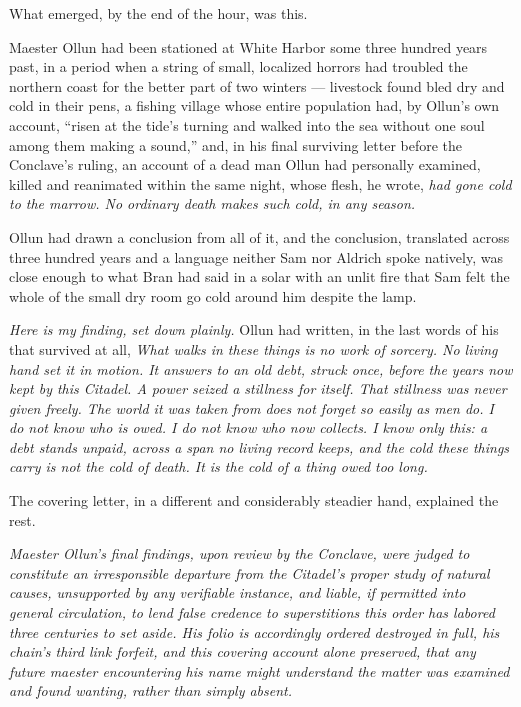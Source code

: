What emerged, by the end of the hour, was this.

Maester Ollun had been stationed at White Harbor some three hundred years past, in a period when a string of small, localized horrors had troubled the northern coast for the better part of two winters — livestock found bled dry and cold in their pens, a fishing village whose entire population had, by Ollun’s own account, “risen at the tide’s turning and walked into the sea without one soul among them making a sound,” and, in his final surviving letter before the Conclave’s ruling, an account of a dead man Ollun had personally examined, killed and reanimated within the same night, whose flesh, he wrote, \textit{had gone cold to the marrow. No ordinary death makes such cold, in any season.}

Ollun had drawn a conclusion from all of it, and the conclusion, translated across three hundred years and a language neither Sam nor Aldrich spoke natively, was close enough to what Bran had said in a solar with an unlit fire that Sam felt the whole of the small dry room go cold around him despite the lamp.

\textit{Here is my finding, set down plainly.} Ollun had written, in the last words of his that survived at all, \textit{What walks in these things is no work of sorcery. No living hand set it in motion. It answers to an old debt, struck once, before the years now kept by this Citadel. A power seized a stillness for itself. That stillness was never given freely. The world it was taken from does not forget so easily as men do. I do not know who is owed. I do not know who now collects. I know only this: a debt stands unpaid, across a span no living record keeps, and the cold these things carry is not the cold of death. It is the cold of a thing owed too long.}

The covering letter, in a different and considerably steadier hand, explained the rest.

\textit{Maester Ollun’s final findings, upon review by the Conclave, were judged to constitute an irresponsible departure from the Citadel’s proper study of natural causes, unsupported by any verifiable instance, and liable, if permitted into general circulation, to lend false credence to superstitions this order has labored three centuries to set aside. His folio is accordingly ordered destroyed in full, his chain’s third link forfeit, and this covering account alone preserved, that any future maester encountering his name might understand the matter was examined and found wanting, rather than simply absent.}


